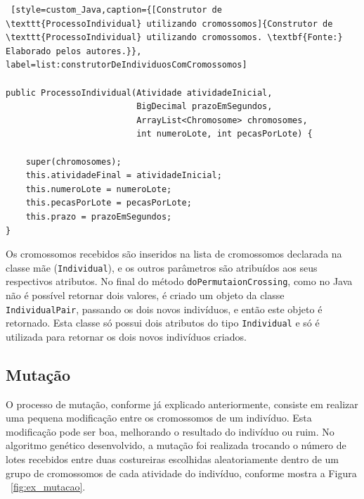 \begin{lstlisting} [style=custom_Java,caption={[Construtor de \texttt{ProcessoIndividual} utilizando cromossomos]{Construtor de \texttt{ProcessoIndividual} utilizando cromossomos. \textbf{Fonte:} Elaborado pelos autores.}}, label=list:construtorDeIndividuosComCromossomos] 

public ProcessoIndividual(Atividade atividadeInicial, 
						  BigDecimal prazoEmSegundos, 
						  ArrayList<Chromosome> chromosomes, 
						  int numeroLote, int pecasPorLote) {

	super(chromosomes);
	this.atividadeFinal = atividadeInicial;
	this.numeroLote = numeroLote;
	this.pecasPorLote = pecasPorLote;
	this.prazo = prazoEmSegundos;
}

\end{lstlisting}
\par Os cromossomos recebidos são inseridos na lista de cromossomos declarada na classe mãe (\texttt{Individual}), e os 
outros parâmetros são atribuídos aos seus respectivos atributos. No final do método \texttt{doPermutaionCrossing}, como no 
Java não é possível retornar dois valores, é criado um objeto da classe \texttt{IndividualPair}, passando os dois novos indivíduos, 
e então este objeto é retornado. Esta classe só possui dois atributos do tipo \texttt{Individual} e só é utilizada para retornar os dois 
novos indivíduos criados.

\subsection{Mutação}
\par O processo de mutação, conforme já explicado anteriormente, consiste em realizar uma pequena modificação entre os cromossomos
de um indivíduo. Esta modificação pode ser boa, melhorando o resultado do indivíduo ou ruim. No algoritmo genético desenvolvido, 
a mutação foi realizada trocando o número de lotes recebidos entre duas costureiras escolhidas aleatoriamente dentro de um grupo de cromossomos de cada atividade do indivíduo, conforme mostra a Figura ~\ref{fig:ex_mutacao}.


